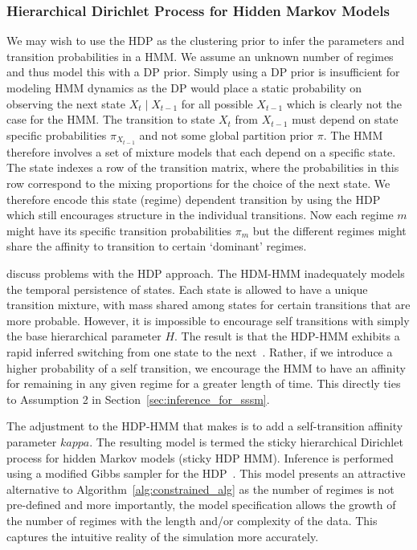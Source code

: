 \subsubsection{Hierarchical Dirichlet Process for Hidden Markov Models}
We may wish to use the HDP as the clustering prior to infer the parameters and transition probabilities in a HMM. We assume an unknown number of regimes and thus model this with a DP prior. Simply using a DP prior is insufficient for modeling HMM dynamics as the DP would place a static probability on observing the next state $X_t \mid X_{t-1}$ for all possible $X_{t-1}$ which is clearly not the case for the HMM. The transition to state $X_t$ from $X_{t-1}$ must depend on state specific probabilities $\pi_{X_{t-1}}$ and not some global partition prior $\pi$. The HMM therefore involves a set of mixture models that each depend on a specific state. The state indexes a row of the transition matrix, where the probabilities in this row correspond to the mixing proportions for the choice of the next state. We therefore encode this state (regime) dependent transition by using the HDP which still encourages structure in the individual transitions. Now each regime $m$ might have its specific transition probabilities $\pi_m$ but the different regimes might share the affinity to transition to certain `dominant' regimes.

\cite{fox2009nonparametric, fox2007hierarchical} discuss problems with the HDP approach. The HDM-HMM inadequately models the temporal persistence of states. Each state is allowed to have a unique transition mixture, with mass shared among states for certain transitions that are more probable. However, it is impossible to encourage self transitions with simply the base hierarchical parameter $H$. The result is that the HDP-HMM exhibits a rapid inferred switching from one state to the next~\citep{fox2007hierarchical}. Rather, if we introduce a higher probability of a self transition, we encourage the HMM to have an affinity for remaining in any given regime for a greater length of time. This directly ties to Assumption 2 in Section~\ref{sec:inference_for_sssm}.

The adjustment to the HDP-HMM that \cite{fox2009nonparametric,fox2007hierarchical} makes is to add a self-transition affinity parameter $kappa$. The resulting model is termed the sticky hierarchical Dirichlet process for hidden Markov models (sticky HDP HMM). Inference is performed using a modified Gibbs sampler for the HDP~\citep{teh2005sharing}. This model presents an attractive alternative to Algorithm~\ref{alg:constrained_alg} as the number of regimes is not pre-defined and more importantly, the model specification allows the growth of the number of regimes with the length and/or complexity of the data. This captures the intuitive reality of the simulation more accurately.

